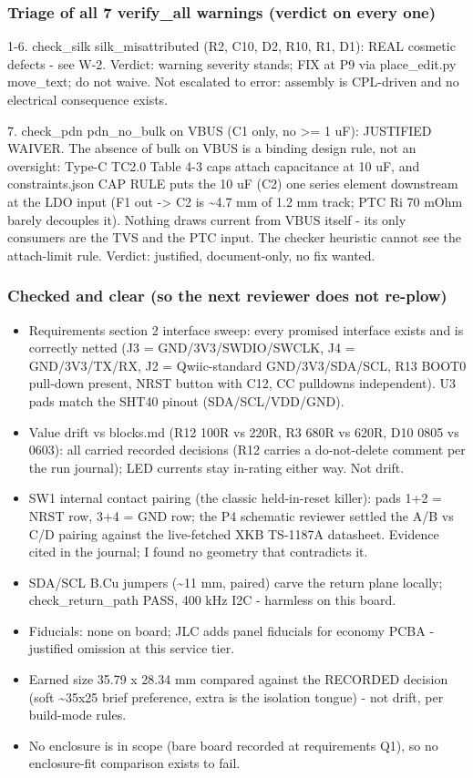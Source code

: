 \documentclass[11pt,a4paper]{article}
\begin{document}
\subsubsection*{Triage of all 7 verify\_all warnings (verdict on every one)}
1-6. check\_silk silk\_misattributed (R2, C10, D2, R10, R1, D1): REAL cosmetic defects - see W-2. Verdict: warning severity stands; FIX at P9 via place\_edit.py move\_text; do not waive. Not escalated to error: assembly is CPL-driven and no electrical consequence exists.

7. check\_pdn pdn\_no\_bulk on VBUS (C1 only, no \textgreater{}= 1 uF): JUSTIFIED WAIVER. The absence of bulk on VBUS is a binding design rule, not an oversight: Type-C TC2.0 Table 4-3 caps attach capacitance at 10 uF, and constraints.json CAP RULE puts the 10 uF (C2) one series element downstream at the LDO input (F1 out -\textgreater{} C2 is \textasciitilde{}4.7 mm of 1.2 mm track; PTC Ri 70 mOhm barely decouples it). Nothing draws current from VBUS itself - its only consumers are the TVS and the PTC input. The checker heuristic cannot see the attach-limit rule. Verdict: justified, document-only, no fix wanted.

\subsubsection*{Checked and clear (so the next reviewer does not re-plow)}
\begin{itemize}
\item Requirements section 2 interface sweep: every promised interface exists and
is correctly netted (J3 = GND/3V3/SWDIO/SWCLK, J4 = GND/3V3/TX/RX, J2 =
Qwiic-standard GND/3V3/SDA/SCL, R13 BOOT0 pull-down present, NRST button
with C12, CC pulldowns independent). U3 pads match the SHT40 pinout
(SDA/SCL/VDD/GND).
\item Value drift vs blocks.md (R12 100R vs 220R, R3 680R vs 620R, D10 0805 vs
0603): all carried recorded decisions (R12 carries a do-not-delete comment
per the run journal); LED currents stay in-rating either way. Not drift.
\item SW1 internal contact pairing (the classic held-in-reset killer): pads 1+2 =
NRST row, 3+4 = GND row; the P4 schematic reviewer settled the A/B vs C/D
pairing against the live-fetched XKB TS-1187A datasheet. Evidence cited in
the journal; I found no geometry that contradicts it.
\item SDA/SCL B.Cu jumpers (\textasciitilde{}11 mm, paired) carve the return plane locally;
check\_return\_path PASS, 400 kHz I2C - harmless on this board.
\item Fiducials: none on board; JLC adds panel fiducials for economy PCBA -
justified omission at this service tier.
\item Earned size 35.79 x 28.34 mm compared against the RECORDED decision (soft
\textasciitilde{}35x25 brief preference, extra is the isolation tongue) - not drift, per
build-mode rules.
\item No enclosure is in scope (bare board recorded at requirements Q1), so no
enclosure-fit comparison exists to fail.
\end{itemize}
\end{document}
